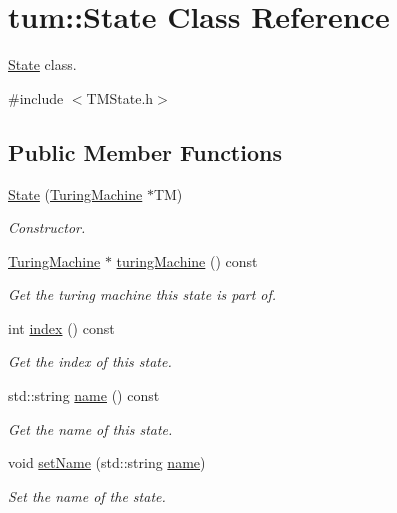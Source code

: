 \hypertarget{classtum_1_1_state}{\section{tum\-:\-:\-State \-Class \-Reference}
\label{classtum_1_1_state}
}


\hyperlink{classtum_1_1_state}{\-State} class.  




{\ttfamily \#include $<$\-T\-M\-State.\-h$>$}

\subsection*{\-Public \-Member \-Functions}
\begin{DoxyCompactItemize}
\item 
\hyperlink{classtum_1_1_state_a07b148a853bb0d12cf17c409e4375cf2}{\-State} (\hyperlink{classtum_1_1_turing_machine}{\-Turing\-Machine} $\ast$\-T\-M)
\begin{DoxyCompactList}\small\item\em \-Constructor. \end{DoxyCompactList}\item 
\hyperlink{classtum_1_1_turing_machine}{\-Turing\-Machine} $\ast$ \hyperlink{classtum_1_1_state_ad3e8ce09298542d6b0b8aec6f62e1cdf}{turing\-Machine} () const 
\begin{DoxyCompactList}\small\item\em \-Get the turing machine this state is part of. \end{DoxyCompactList}\item 
int \hyperlink{classtum_1_1_state_a70bbe96aa9aad33d3a173143ef9ac372}{index} () const 
\begin{DoxyCompactList}\small\item\em \-Get the index of this state. \end{DoxyCompactList}\item 
std\-::string \hyperlink{classtum_1_1_state_a89f40f5593859d25d4f2a54580046060}{name} () const 
\begin{DoxyCompactList}\small\item\em \-Get the name of this state. \end{DoxyCompactList}\item 
void \hyperlink{classtum_1_1_state_a4e008e0093650d4089a5b5d06edf27b0}{set\-Name} (std\-::string \hyperlink{classtum_1_1_state_a89f40f5593859d25d4f2a54580046060}{name})
\begin{DoxyCompactList}\small\item\em \-Set the name of the state. \end{DoxyCompactList}\item 

\end{DoxyCompactItemize}
